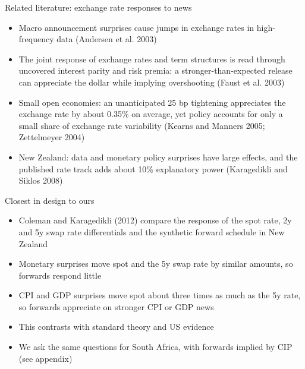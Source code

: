 \documentclass[
  ignorenonframetext,
  aspectratio=141,
]{beamer}
\providecommand{\tightlist}{%
  \setlength{\itemsep}{0pt}\setlength{\parskip}{0pt}}\usepackage{longtable,booktabs,array}
\begin{document}
\begin{frame}{Related literature: exchange rate responses to news}
\label{related-literature-exchange-rate-responses-to-news}
\begin{itemize}
\tightlist
\item
  Macro announcement surprises cause jumps in exchange rates in
  high-frequency data (Andersen et al. 2003)
\item
  The joint response of exchange rates and term structures is read
  through uncovered interest parity and risk premia: a
  stronger-than-expected release can appreciate the dollar while
  implying overshooting (Faust et al. 2003)
\item
  Small open economies: an unanticipated 25 bp tightening appreciates
  the exchange rate by about 0.35\% on average, yet policy accounts for
  only a small share of exchange rate variability (Kearns and Manners
  2005; Zettelmeyer 2004)
\item
  New Zealand: data and monetary policy surprises have large effects,
  and the published rate track adds about 10\% explanatory power
  (Karagedikli and Siklos 2008)
\end{itemize}
\end{frame}

\begin{frame}{Closest in design to ours}
\label{closest-in-design-to-ours}
\begin{itemize}
\tightlist
\item
  Coleman and Karagedikli (2012) compare the response of the spot rate,
  2y and 5y swap rate differentials and the synthetic forward schedule
  in New Zealand
\item
  Monetary surprises move spot and the 5y swap rate by similar amounts,
  so forwards respond little
\item
  CPI and GDP surprises move spot about three times as much as the 5y
  rate, so forwards appreciate on stronger CPI or GDP news
\item
  This contrasts with standard theory and US evidence
\item
  We ask the same questions for South Africa, with forwards implied by
  CIP (see appendix)
\end{itemize}
\end{frame}
\end{document}
